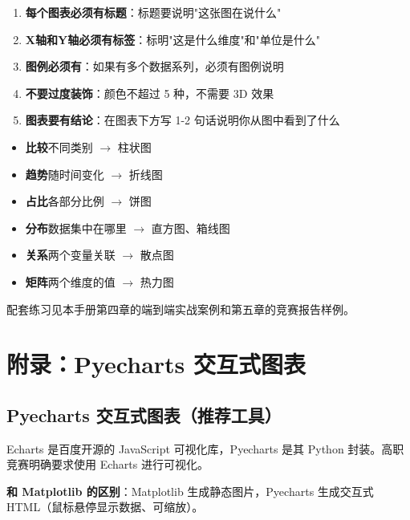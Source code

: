 \documentclass[12pt,a4paper]{article}
\begin{document}
\begin{knowledgebox}[报告图表的黄金法则]
\begin{enumerate}
    \item \textbf{每个图表必须有标题}：标题要说明"这张图在说什么"
    \item \textbf{X轴和Y轴必须有标签}：标明"这是什么维度"和"单位是什么"
    \item \textbf{图例必须有}：如果有多个数据系列，必须有图例说明
    \item \textbf{不要过度装饰}：颜色不超过 5 种，不需要 3D 效果
    \item \textbf{图表要有结论}：在图表下方写 1-2 句话说明你从图中看到了什么
\end{enumerate}
\end{knowledgebox}

\begin{tipbox}[常见图表选择指南]
\begin{itemize}
    \item \textbf{比较}不同类别 $\rightarrow$ 柱状图
    \item \textbf{趋势}随时间变化 $\rightarrow$ 折线图
    \item \textbf{占比}各部分比例 $\rightarrow$ 饼图
    \item \textbf{分布}数据集中在哪里 $\rightarrow$ 直方图、箱线图
    \item \textbf{关系}两个变量关联 $\rightarrow$ 散点图
    \item \textbf{矩阵}两个维度的值 $\rightarrow$ 热力图
\end{itemize}
\end{tipbox}

\begin{tipbox}[配套练习]
配套练习见本手册第四章的端到端实战案例和第五章的竞赛报告样例。
\end{tipbox}

\section{附录：Pyecharts 交互式图表}

\subsection{Pyecharts 交互式图表（推荐工具）}

\begin{knowledgebox}
Echarts 是百度开源的 JavaScript 可视化库，Pyecharts 是其 Python 封装。高职竞赛明确要求使用 Echarts 进行可视化。

\textbf{和 Matplotlib 的区别}：Matplotlib 生成静态图片，Pyecharts 生成交互式 HTML（鼠标悬停显示数据、可缩放）。
\end{knowledgebox}
\end{document}
